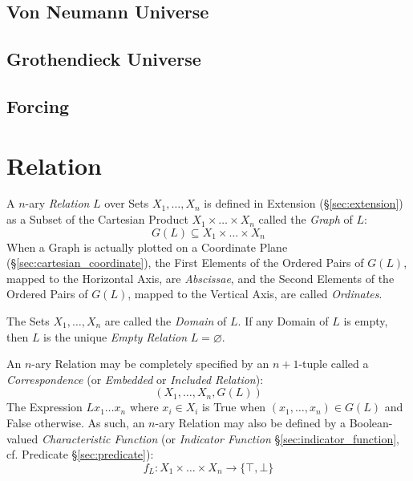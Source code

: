 \subsection{Von Neumann Universe}\label{sec:vonneumann_universe}

\subsection{Grothendieck Universe}\label{sec:grothendieck_universe}


\subsection{Forcing}\label{sec:forcing}



\section{Relation}\label{sec:relation}

A $n$-ary \emph{Relation} $L$ over Sets $X_1, \ldots, X_n$ is defined
in Extension (\S\ref{sec:extension}) as a Subset of the Cartesian
Product $X_1 \times \ldots \times X_n$ called the \emph{Graph} of $L$:
\[
  G(L) \subseteq X_1 \times \ldots \times X_n
\]
When a Graph is actually plotted on a Coordinate Plane
(\S\ref{sec:cartesian_coordinate}), the First Elements of the Ordered
Pairs of $G(L)$, mapped to the Horizontal Axis, are \emph{Abscissae},
and the Second Elements of the Ordered Pairs of $G(L)$, mapped to the
Vertical Axis, are called \emph{Ordinates}.

The Sets $X_1, \ldots, X_n$ are called the \emph{Domain} of $L$. If
any Domain of $L$ is empty, then $L$ is the unique \emph{Empty
  Relation} $L = \varnothing$.

An $n$-ary Relation may be completely specified by an $n + 1$-tuple
called a \emph{Correspondence} (or \emph{Embedded} or \emph{Included
  Relation}):
\[
  (X_1, \ldots, X_n, G(L))
\]
The Expression $L x_1 \ldots x_n$ where $x_i \in X_i$ is True when
$(x_1, \ldots, x_n) \in G(L)$ and False otherwise. As such, an $n$-ary
Relation may also be defined by a Boolean-valued \emph{Characteristic
  Function} (or \emph{Indicator Function}
\S\ref{sec:indicator_function}, cf. Predicate \S\ref{sec:predicate}):
\[
  f_L : X_1 \times \ldots \times X_n \rightarrow \{\top,\bot\}
\]




